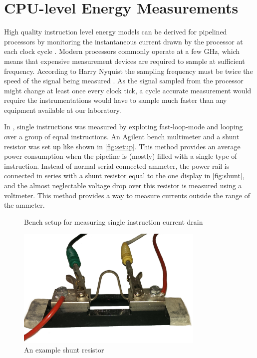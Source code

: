 \section{CPU-level Energy Measurements}

High quality instruction level energy models can be derived for pipelined
processors by monitoring the instantaneous current drawn by the processor at
each clock cycle \cite{nikolaidis2005instruction}. Modern processors commonly
operate at a few GHz, which means that expensive measurement devices are
required to sample at sufficient frequency. According to Harry Nyquist the
sampling frequency must be twice the speed of the signal being measured
\cite{nyquist1928certain}. As the signal sampled from the processor might
change at least once every clock tick, a cycle accurate measurement would
require the instrumentations would have to sample much faster than any equipment
available at our laboratory.

In \cite{rundehvatum2013exploring}, single instructions was measured by
exploting fast-loop-mode and looping over a group of equal instructions. An
Agilent bench multimeter and a shunt resistor was set up like shown in
\autoref{fig:setup}.  This method provides an average power consumption when the
pipeline is (mostly) filled with a single type of instruction. Instead of normal
serial connected ammeter, the power rail is connected in series with a shunt
resistor equal to the one display in \autoref{fig:shunt}, and the almost
neglectable voltage drop over this resistor is measured using a voltmeter. This
method provides a way to measure currents outside the range of the ammeter.

\begin{figure}
    \centering
    
    \caption{Bench setup for measuring single instruction current drain}
    \label{fig:setup}
\end{figure}

\begin{figure}
    \centering
    \includegraphics[width=0.8\textwidth]{figs/shunt.jpg}
    \caption{An example shunt resistor}
    \label{fig:shunt}
\end{figure}


